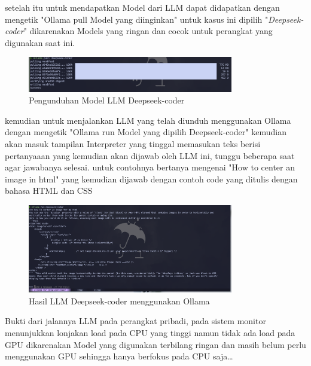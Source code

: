 \documentclass[a4paper,12pt, bahasa]{article}
\begin{document}
setelah itu untuk mendapatkan Model dari LLM dapat didapatkan dengan mengetik "Ollama pull {Model yang diinginkan}" untuk kasus ini dipilih "\textit{Deepseek-coder}" dikarenakan Models yang ringan dan cocok untuk perangkat yang digunakan saat ini. 

\begin{figure}[H]
  \begin{center}
    \includegraphics[width=0.80\textwidth]{images/gambar4.png}
    \caption{Pengunduhan Model LLM Deepseek-coder}
  \end{center}
\end{figure}

kemudian untuk menjalankan LLM yang telah diunduh menggunakan Ollama dengan mengetik "Ollama run {Model yang dipilih} Deepseek-coder" kemudian akan masuk tampilan Interpreter yang tinggal memasukan teks berisi pertanyaaan yang kemudian akan dijawab oleh LLM ini, tunggu beberapa saat agar jawabanya selesai.  untuk contohnya bertanya mengenai "How to center an image in html" yang kemudian dijawab dengan contoh code yang ditulis dengan bahasa HTML dan CSS

\begin{figure}[H]
  \begin{center}
    \includegraphics[width=0.80\textwidth]{images/gambar5.png}
    \caption{Hasil LLM Deepseek-coder menggunakan Ollama}
  \end{center}
\end{figure}
Bukti dari jalannya LLM pada perangkat pribadi, pada sistem monitor menunjukkan lonjakan load pada CPU yang tinggi namun tidak ada load pada GPU dikarenakan Model yang digunakan terbilang ringan dan masih belum perlu menggunakan GPU sehingga hanya berfokus pada CPU saja\dots
\end{document}
